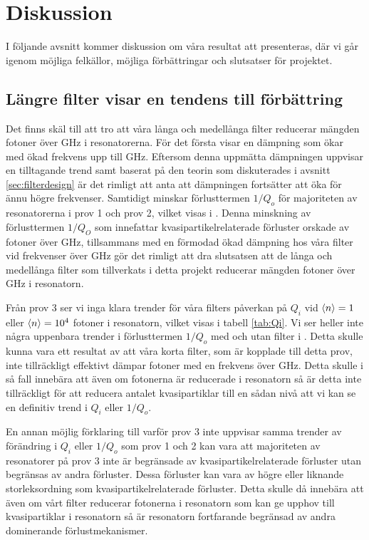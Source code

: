 \documentclass[main.tex]{subfiles}
\begin{document}
\chapter{Diskussion}
\label{ch:discussion} 

I följande avsnitt kommer diskussion om våra resultat att presenteras, där vi går igenom möjliga felkällor, möjliga förbättringar och slutsatser för projektet. 

\section{Längre filter visar en tendens till förbättring}


Det finns skäl till att tro att våra långa och medellånga filter reducerar mängden fotoner över \unit[88]{GHz} i resonatorerna. För det första visar  en dämpning som ökar med ökad frekvens upp till \unit[50]{GHz}. Eftersom denna uppmätta dämpningen uppvisar en tilltagande trend samt baserat på den teorin som diskuterades i avsnitt \ref{sec:filterdesign} är det rimligt att anta att dämpningen fortsätter att öka för ännu högre frekvenser. Samtidigt minskar förlusttermen $1/Q_o$ för majoriteten av resonatorerna i prov 1 och prov 2, vilket visas i . Denna minskning av förlusttermen $1/Q_O$ som innefattar kvasipartikelrelaterade förluster orskade av fotoner över \unit[88]{GHz}, tillsammans med en förmodad ökad dämpning hos våra filter vid frekvenser över \unit[50]{GHz} gör det rimligt att dra slutsatsen att de långa och medellånga filter som tillverkats i detta projekt reducerar mängden fotoner över \unit[88]{GHz} i resonatorn.

Från prov 3 ser vi inga klara trender för våra filters påverkan på $Q_i$ vid $\expval{n}=1$ eller $\expval{n}=10^4$ fotoner i resonatorn, vilket visas i tabell \ref{tab:Qi}. Vi ser heller inte några uppenbara trender i förlusttermen $1/Q_o$ med och utan filter i . Detta skulle kunna vara ett resultat av att våra korta filter, som är kopplade till detta prov, inte tillräckligt effektivt dämpar fotoner med en frekvens över \unit[88]{GHz}. Detta skulle i så fall innebära att även om fotonerna är reducerade i resonatorn så är detta inte tillräckligt för att reducera antalet kvasipartiklar till en sådan nivå att vi kan se en definitiv trend i $Q_i$ eller $1/Q_o$.

En annan möjlig förklaring till varför prov 3 inte uppvisar samma trender av förändring i $Q_i$ eller $1/Q_o$ som prov 1 och 2 kan vara att majoriteten av resonatorer på prov 3 inte är begränsade av kvasipartikelrelaterade förluster utan begränsas av andra förluster. Dessa förluster kan vara av högre eller liknande storleksordning som kvasipartikelrelaterade förluster. Detta skulle då innebära att även om vårt filter reducerar fotonerna i resonatorn som kan ge upphov till kvasipartiklar i resonatorn så är resonatorn fortfarande begränsad av andra dominerande förlustmekanismer.
\end{document}
